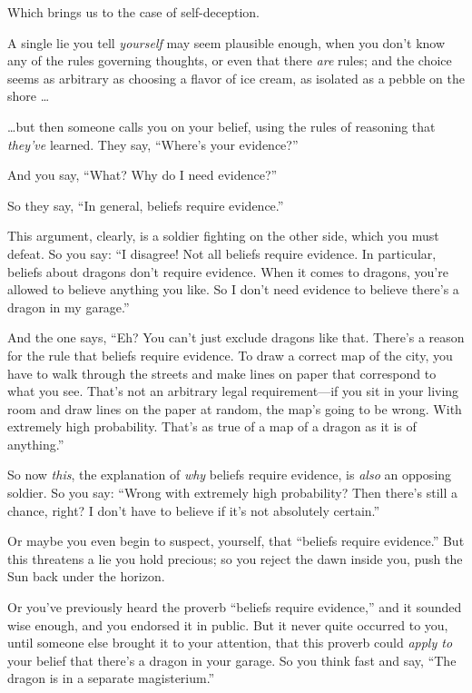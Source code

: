 {
 Which brings us to the case of self-deception.}

{
 A single lie you tell \textit{yourself} may seem plausible enough,
when you don't know any of the rules governing
thoughts, or even that there \textit{are} rules; and the choice seems
as arbitrary as choosing a flavor of ice cream, as isolated as a pebble
on the shore \ldots}

{
 \ldots but then someone calls you on your belief, using the rules
of reasoning that \textit{they've} learned. They say,
``Where's your
evidence?''}

{
 And you say, ``What? Why do I need
evidence?''}

{
 So they say, ``In general, beliefs require
evidence.''}

{
 This argument, clearly, is a soldier fighting on the other side,
which you must defeat. So you say: ``I disagree! Not
all beliefs require evidence. In particular, beliefs about dragons
don't require evidence. When it comes to dragons,
you're allowed to believe anything you like. So I
don't need evidence to believe there's
a dragon in my garage.''}

{
 And the one says, ``Eh? You can't
just exclude dragons like that. There's a reason for
the rule that beliefs require evidence. To draw a correct map of the
city, you have to walk through the streets and make lines on paper that
correspond to what you see. That's not an arbitrary
legal requirement---if you sit in your living room and draw lines on
the paper at random, the map's going to be wrong. With
extremely high probability. That's as true of a map of
a dragon as it is of anything.''}

{
 So now \textit{this}, the explanation of \textit{why} beliefs
require evidence, is \textit{also} an opposing soldier. So you say:
``Wrong with extremely high probability? Then
there's still a chance, right? I don't
have to believe if it's not absolutely
certain.''}

{
 Or maybe you even begin to suspect, yourself, that
``beliefs require evidence.'' But
this threatens a lie you hold precious; so you reject the dawn inside
you, push the Sun back under the horizon.}

{
 Or you've previously heard the proverb
``beliefs require evidence,'' and it
sounded wise enough, and you endorsed it in public. But it never quite
occurred to you, until someone else brought it to your attention, that
this proverb could \textit{apply to} your belief that
there's a dragon in your garage. So you think fast and
say, ``The dragon is in a separate
magisterium.''}

